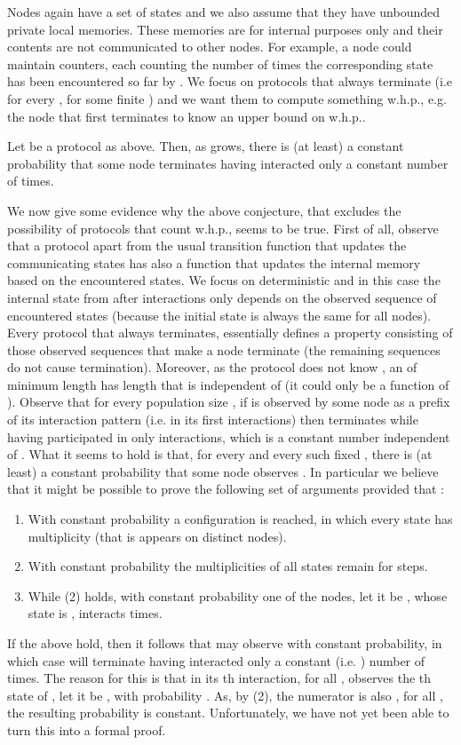 \documentclass[oribibl, 11pt]{llncs}
\begin{document}
Nodes again have a set of states  and we also assume that they have unbounded private local memories. These memories are for internal purposes only and their contents are not communicated to other nodes. For example, a node  could maintain  counters, each counting the number of times the corresponding state has been encountered so far by . We focus on protocols that always terminate (i.e for every , for some finite ) and we want them to compute something w.h.p., e.g. the node that first terminates to know an upper bound on  w.h.p..

\begin{conjecture} \label{conj:count-impossibility}
Let  be a protocol as above. Then, as  grows, there is (at least) a constant probability that some node terminates having interacted only a constant number of times.  
\end{conjecture}

We now give some evidence why the above conjecture, that excludes the possibility of protocols that count  w.h.p., seems to be true. First of all, observe that a protocol apart from the usual transition function  that updates the communicating states has also a function  that updates the internal memory based on the encountered states. We focus on deterministic  and in this case the internal state from  after  interactions only depends on the observed sequence  of encountered states (because the initial state  is always the same for all nodes). Every protocol  that always terminates, essentially defines a property  consisting of those observed sequences that make a node terminate (the remaining sequences do not cause termination). Moreover, as the protocol does not know , an  of minimum length has length that is independent of  (it could only be a function of ). Observe that for every population size , if  is observed by some node  as a prefix of its interaction pattern (i.e. in its first  interactions) then  terminates while having participated in only  interactions, which is a constant number independent of . What it seems to hold is that, for every  and every such fixed , there is (at least) a constant probability that some node observes . In particular we believe that it might be possible to prove the following set of arguments provided that :
\begin{enumerate}
\item With constant probability a configuration is reached, in which every state  has multiplicity  (that is appears on  distinct nodes).
\item With constant probability the multiplicities of all states remain  for  steps.
\item While (2) holds, with constant probability one of the  nodes, let it be , whose state is , interacts  times.
\end{enumerate}
If the above hold, then it follows that  may observe  with constant probability, in which case  will terminate having interacted only a constant (i.e. ) number of times. The reason for this is that in its th interaction, for all ,  observes the th state of , let it be , with probability . As, by (2), the numerator is also , for all , the resulting probability is constant. Unfortunately, we have not yet been able to turn this into a formal proof. 
\end{document}
